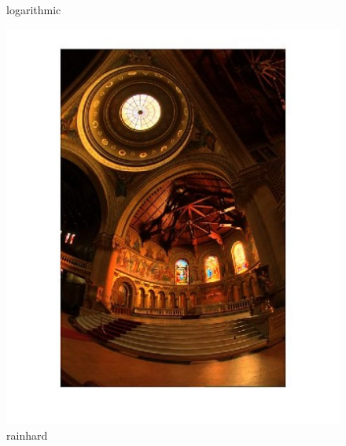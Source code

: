 \begin{figure}[!htb]
  	\caption{logarithmic}\label{fig:lineartonemap}
  	\endminipage\hfill
   \end{figure}
      
  \begin{figure}[!htb]
      	\includegraphics[width=\linewidth]{images/reinhardhdr1}
      	\caption{rainhard}\label{fig:logtonemap}
    \endminipage\hfill
   \end{figure}
      
